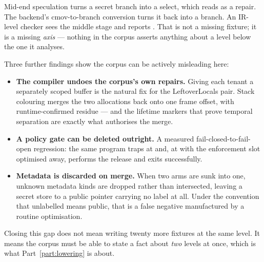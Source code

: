 Mid-end speculation turns a secret branch into a select, which reads as a repair.
The backend's cmov-to-branch conversion turns it back into a branch. An IR-level
checker sees the middle stage and reports \Verified{}. That is not a missing
fixture; it is a missing \emph{axis} --- nothing in the corpus asserts anything
about a level below the one it analyses.

Three further findings show the corpus can be actively misleading here:

\begin{itemize}[nosep,leftmargin=1.4em]
\item \textbf{The compiler undoes the corpus's own repairs.} Giving each tenant a
      separately scoped buffer is the natural fix for the LeftoverLocals pair.
      Stack colouring merges the two allocations back onto one frame offset, with
      runtime-confirmed residue --- and the lifetime markers that prove temporal
      separation are exactly what authorises the merge.
\item \textbf{A policy gate can be deleted outright.} A measured
      fail-closed-to-fail-open regression: the same program traps at 
      and, at  with the enforcement slot optimised away, performs the
      release and exits successfully.
\item \textbf{Metadata is discarded on merge.} When two arms are sunk into one,
      unknown metadata kinds are dropped rather than intersected, leaving a
      secret store to a public pointer carrying no label at all. Under the
      convention that unlabelled means public, that is a false negative
      manufactured by a routine optimisation.
\end{itemize}

Closing this gap does not mean writing twenty more fixtures at the same level. It
means the corpus must be able to state a fact about \emph{two} levels at once,
which is what Part~\ref{part:lowering} is about.
